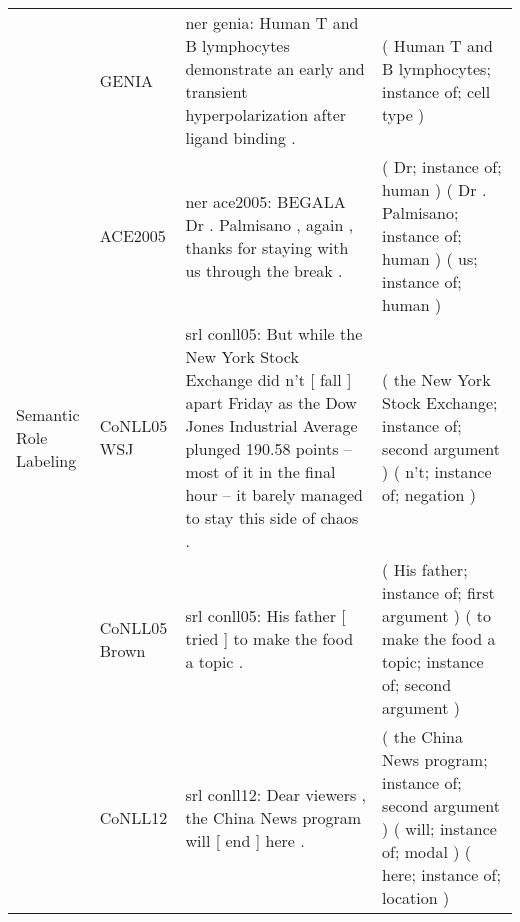 \begin{table*}[]
{\begin{tabular}{@{}p{2.7cm}lp{10.5cm}p{10.5cm}@{}}
                                     & GENIA            & \quad ner genia: {\color{black} Human T and B lymphocytes} demonstrate an early and transient hyperpolarization after ligand binding .
                                                        & ( {\color{orange} Human T and B lymphocytes}; instance of; {\color{orange} cell type} )
                                                        \\
                                     & ACE2005          & \quad ner ace2005: BEGALA {\color{black} Dr . Palmisano} , again , thanks for staying with {\color{black} us} through the break .
                                                        & ( {\color{orange} Dr}; instance of; {\color{orange} human} ) ( {\color{orange} Dr . Palmisano}; instance of; {\color{orange} human} ) ( {\color{orange} us}; instance of; {\color{orange} human} )
                                                        \\ \midrule
Semantic Role Labeling               & CoNLL05 WSJ      & \quad srl conll05: But while {\color{black} the New York Stock Exchange} did {\color{black} n't} [ fall ] apart Friday as the Dow Jones Industrial Average plunged 190.58 points -- most of it in the final hour -- it barely managed to stay this side of chaos .
                                                        & ( {\color{orange} the New York Stock Exchange}; instance of; {\color{orange} second argument} ) ( {\color{orange} n't}; instance of; {\color{orange} negation} )
                                                        \\
                                     & CoNLL05 Brown    & \quad srl conll05: {\color{black} His father} [ tried ] {\color{black} to make the food a topic} .
                                                        & ( {\color{orange} His father}; instance of; {\color{orange} first argument} ) ( {\color{orange} to make the food a topic}; instance of; {\color{orange} second argument} )
                                                        \\
                                     & CoNLL12          & \quad srl conll12: Dear viewers , {\color{black} the China News program} {\color{black} will} [ end ] {\color{black} here} .
                                                        & ( {\color{orange} the China News program}; instance of; {\color{orange} second argument} ) ( {\color{orange} will}; instance of; {\color{orange} modal} ) ( {\color{orange} here}; instance of; {\color{orange} location} )
                                                        \\ \midrule

\end{tabular}}
\end{table*}
